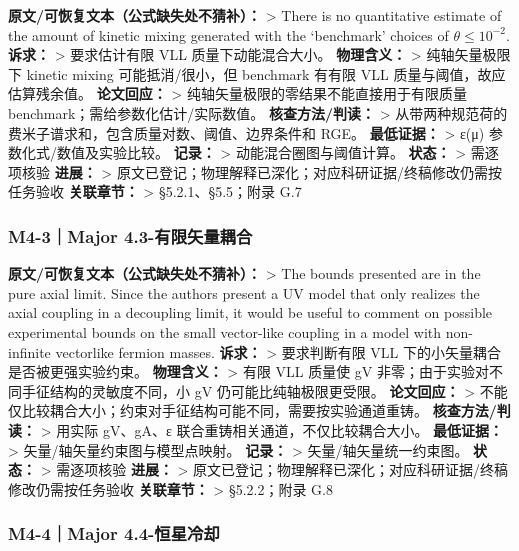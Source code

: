 \documentclass[
]{article}
\begin{document}
\textbf{原文/可恢复文本（公式缺失处不猜补）：} \textgreater{} There is
no quantitative estimate of the amount of kinetic mixing generated with
the `benchmark' choices of \(\theta\leq10^{-2}\). \textbf{诉求：}
\textgreater{} 要求估计有限 VLL 质量下动能混合大小。 \textbf{物理含义：}
\textgreater{} 纯轴矢量极限下 kinetic mixing 可能抵消/很小，但 benchmark
有有限 VLL 质量与阈值，故应估算残余值。 \textbf{论文回应：}
\textgreater{} 纯轴矢量极限的零结果不能直接用于有限质量
benchmark；需给参数化估计/实际数值。 \textbf{核查方法/判读：}
\textgreater{}
从带两种规范荷的费米子谱求和，包含质量对数、阈值、边界条件和 RGE。
\textbf{最低证据：} \textgreater{} ε(μ) 参数化式/数值及实验比较。
\textbf{记录：} \textgreater{} 动能混合圈图与阈值计算。 \textbf{状态：}
\textgreater{} 需逐项核验 \textbf{进展：} \textgreater{}
原文已登记；物理解释已深化；对应科研证据/终稿修改仍需按任务验收
\textbf{关联章节：} \textgreater{} §5.2.1、§5.5；附录 G.7

\subsubsection{M4-3｜Major
4.3-有限矢量耦合}\label{m4-3major-4.3-ux6709ux9650ux77e2ux91cfux8026ux5408}

\textbf{原文/可恢复文本（公式缺失处不猜补）：} \textgreater{} The bounds
presented are in the pure axial limit. Since the authors present a UV
model that only realizes the axial coupling in a decoupling limit, it
would be useful to comment on possible experimental bounds on the small
vector-like coupling in a model with non-infinite vectorlike fermion
masses. \textbf{诉求：} \textgreater{} 要求判断有限 VLL
下的小矢量耦合是否被更强实验约束。 \textbf{物理含义：} \textgreater{}
有限 VLL 质量使 gV 非零；由于实验对不同手征结构的灵敏度不同，小 gV
仍可能比纯轴极限更受限。 \textbf{论文回应：} \textgreater{}
不能仅比较耦合大小；约束对手征结构可能不同，需要按实验通道重铸。
\textbf{核查方法/判读：} \textgreater{} 用实际 gV、gA、ε
联合重铸相关通道，不仅比较耦合大小。 \textbf{最低证据：} \textgreater{}
矢量/轴矢量约束图与模型点映射。 \textbf{记录：} \textgreater{}
矢量/轴矢量统一约束图。 \textbf{状态：} \textgreater{} 需逐项核验
\textbf{进展：} \textgreater{}
原文已登记；物理解释已深化；对应科研证据/终稿修改仍需按任务验收
\textbf{关联章节：} \textgreater{} §5.2.2；附录 G.8

\subsubsection{M4-4｜Major
4.4-恒星冷却}\label{m4-4major-4.4-ux6052ux661fux51b7ux5374}
\end{document}
